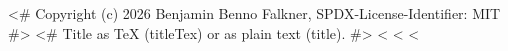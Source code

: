 <# Copyright (c) 2026 Benjamin Benno Falkner, SPDX-License-Identifier: MIT #>
<# Title as TeX (titleTex) or as plain text (title). #>
<%
<%
<%

